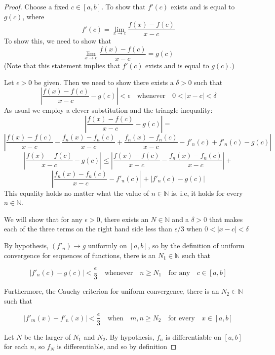 \begin{proof}
Choose a fixed $c\in[a,b]$.  To show that $f'(c)$ exists and is equal to $g(c)$, where
\[
f'(c) = \lim_{x\rightarrow c}\frac{f(x)-f(c)}{x-c}
\]
To show this, we need to show that
\[
\lim_{x\rightarrow c}\frac{f(x)-f(c)}{x-c} = g(c)
\]
(Note that this statement implies that $f'(c)$ exists and is equal to $g(c)$.)
\par\vspace{0.5 cm}
Let $\epsilon>0$ be given.  Then we need to show there exists a $\delta>0$ such that
\[
\left|\frac{f(x)-f(c)}{x-c} - g(c)\right| < \epsilon\quad\mbox{whenever}\quad 0<|x-c| <\delta
\]
As usual we employ a clever substitution and the triangle inequality:
\[
\left|\frac{f(x)-f(c)}{x-c} - g(c)\right| =  
\]
\[
\left|\frac{f(x)-f(c)}{x-c} - \frac{f_n(x)-f_n(c)}{x-c} + \frac{f_n(x)-f_n(c)}{x-c} - f'_n(c) + f'_n(c) - g(c)\right|
\]
\[
\left|\frac{f(x)-f(c)}{x-c} - g(c)\right| \leq \left|\frac{f(x)-f(c)}{x-c} - \frac{f_n(x)-f_n(c)}{x-c} \right| +
\]
\[
\left|\frac{f_n(x)-f_n(c)}{x-c} - f'_n(c) \right| + \left|f'_n(c) - g(c)\right|
\]
This equality holds no matter what the value of $n\in\mathbb{N}$ is, i.e, it holds for every $n\in\mathbb{N}$.
\par\vspace{0.5 cm}
We will show that for any $\epsilon>0$, there exists an $N\in\mathbb{N}$ and a $\delta>0$ that makes each of the three terms on the right hand side less than $\epsilon/3$ when $0 < |x-c| < \delta$
\par\vspace{0.5 cm}
By hypothesis, $(f'_n)\rightarrow g$ uniformly on $[a,b]$, so by the definition of uniform convergence for sequences of functions, there is an $N_1\in\mathbb{N}$ such that
\par\vspace{0.5 cm}
\[
\left|f'_n(c)-g(c)\right| < \frac{\epsilon}{3}\quad\mbox{whenever}\quad n\geq N_1\quad\mbox{for any}\quad c\in[a,b]
\]
\par\vspace{0.5 cm}
Furthermore, the Cauchy criterion for uniform convergence, there is an $N_2\in\mathbb{N}$ such that
\par\vspace{0.5 cm}
\[
\left|f'_m(x)-f'_n(x)\right| < \frac{\epsilon}{3}\quad\mbox{when}\quad m,n\geq N_2\quad\mbox{for every}\quad x\in[a,b]
\]
\par\vspace{0.5 cm}
Let $N$ be the larger of $N_1$ and $N_2$. By hypothesis, $f_n$ is differentiable on $[a,b]$ for each $n$, so $f_N$ is differentiable, and so by definition

\end{proof}
